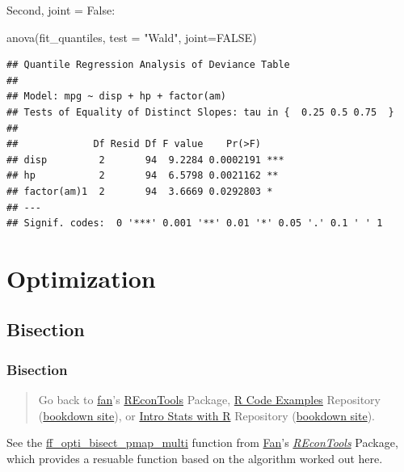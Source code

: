 \documentclass[
]{book}
\newenvironment{Shaded}{\begin{snugshade}}{\end{snugshade}}
\newcommand{\AttributeTok}[1]{\textcolor[rgb]{0.77,0.63,0.00}{#1}}
\newcommand{\ConstantTok}[1]{\textcolor[rgb]{0.00,0.00,0.00}{#1}}
\newcommand{\FunctionTok}[1]{\textcolor[rgb]{0.00,0.00,0.00}{#1}}
\newcommand{\NormalTok}[1]{#1}
\newcommand{\StringTok}[1]{\textcolor[rgb]{0.31,0.60,0.02}{#1}}
\begin{document}
Second, joint = False:

\begin{Shaded}
\begin{Highlighting}[]
\FunctionTok{anova}\NormalTok{(fit\_quantiles, }\AttributeTok{test =} \StringTok{"Wald"}\NormalTok{, }\AttributeTok{joint=}\ConstantTok{FALSE}\NormalTok{)}
\end{Highlighting}
\end{Shaded}

\begin{verbatim}
## Quantile Regression Analysis of Deviance Table
## 
## Model: mpg ~ disp + hp + factor(am)
## Tests of Equality of Distinct Slopes: tau in {  0.25 0.5 0.75  }
## 
##             Df Resid Df F value    Pr(>F)    
## disp         2       94  9.2284 0.0002191 ***
## hp           2       94  6.5798 0.0021162 ** 
## factor(am)1  2       94  3.6669 0.0292803 *  
## ---
## Signif. codes:  0 '***' 0.001 '**' 0.01 '*' 0.05 '.' 0.1 ' ' 1
\end{verbatim}

\hypertarget{optimization}{%
\chapter{Optimization}\label{optimization}}

\hypertarget{bisection}{%
\section{Bisection}\label{bisection}}

\hypertarget{bisection-1}{%
\subsection{Bisection}\label{bisection-1}}

\begin{quote}
Go back to \href{http://fanwangecon.github.io/}{fan}'s \href{https://fanwangecon.github.io/REconTools/}{REconTools} Package, \href{https://fanwangecon.github.io/R4Econ/}{R Code Examples} Repository (\href{https://fanwangecon.github.io/R4Econ/bookdown}{bookdown site}), or \href{https://fanwangecon.github.io/Stat4Econ/}{Intro Stats with R} Repository (\href{https://fanwangecon.github.io/Stat4Econ/bookdown}{bookdown site}).
\end{quote}

See the \href{https://fanwangecon.github.io/REconTools/reference/ff_opti_bisect_pmap_multi.html}{ff\_opti\_bisect\_pmap\_multi} function from \href{https://fanwangecon.github.io/}{Fan}'s \emph{\href{https://fanwangecon.github.io/REconTools/}{REconTools}} Package, which provides a resuable function based on the algorithm worked out here.
\end{document}
